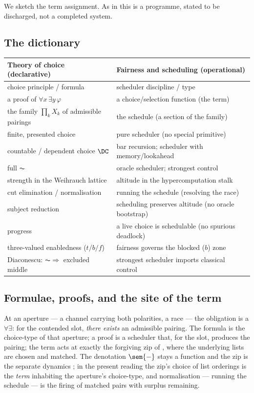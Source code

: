We sketch the term assignment. As in \cite{consensus} this is a programme, stated to be discharged, not
a completed system.

\subsection{The dictionary}

\begin{center}
\renewcommand{\arraystretch}{1.25}
\begin{tabular}{>{\raggedright}p{} >{\raggedright\arraybackslash}p{}}
\textbf{Theory of choice (declarative)} & \textbf{Fairness and scheduling (operational)}\\[2pt]
\hline
choice principle / formula & scheduler discipline / type\\
a proof of $\forall x\,\exists y\,\varphi$ & a choice/selection function (the term)\\
the family $\prod_k X_k$ of admissible pairings & the schedule (a section of the family)\\
finite, presented choice & pure scheduler (no special primitive)\\
countable / dependent choice $\DC$ & bar recursion; scheduler with memory/lookahead\\
full $\AC$ & oracle scheduler; strongest control\\
strength in the Weihrauch lattice & altitude in the hypercomputation stalk\\
cut elimination / normalisation & running the schedule (resolving the race)\\
subject reduction & scheduling preserves altitude (no oracle bootstrap)\\
progress & a live choice is schedulable (no spurious deadlock)\\
three-valued enabledness ($t/b/f$) & fairness governs the blocked ($b$) zone\\
Diaconescu: $\AC \Rightarrow$ excluded middle & strongest scheduler imports classical control\\
\hline
\end{tabular}
\end{center}

\subsection{Formulae, proofs, and the site of the term}

At an aperture --- a channel carrying both polarities, a race --- the obligation is a $\forall\exists$:
for the contended slot, \emph{there exists} an admissible pairing. The formula is the choice-type of that
aperture; a proof is a scheduler that, for the slot, produces the pairing; the term acts at exactly the
forgiving zip of \cite{qcs}, where the underlying lists are chosen and matched. The denotation $\sem{-}$
stays a function and the zip is the separate dynamics \cite{qcs}; in the present reading the zip's choice
of list orderings is the \emph{term} inhabiting the aperture's choice-type, and normalisation --- running
the schedule --- is the firing of matched pairs with surplus remaining.

